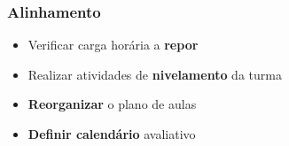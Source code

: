 \documentclass{beamer}
\begin{document}
\begin{frame}
\frametitle{Alinhamento}
\begin{itemize}
\item Verificar carga horária a \textbf{repor}
\item Realizar atividades de \textbf{nivelamento} da turma
\item \textbf{Reorganizar} o plano de aulas
\item \textbf{Definir calendário} avaliativo

\end{itemize}
\end{frame}

\backmatter
\end{document}
